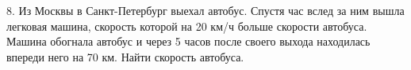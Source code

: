 8. Из Москвы в Санкт-Петербург выехал автобус. Спустя час вслед за ним вышла
легковая машина, скорость которой на 20 км/ч больше скорости автобуса. Машина обогнала автобус и через 5 часов после своего выхода находилась впереди него на 70 км. Найти скорость автобуса.\\
